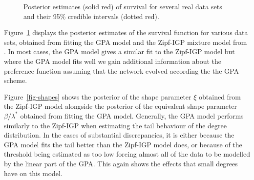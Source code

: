 \documentclass[
  sn-basic,
]{sn-jnl}
\theoremstyle{plain}
\theoremstyle{plain}
\theoremstyle{remark}
\begin{document}
\begin{figure}


\caption{\label{fig-real1}Posterior estimates (solid red) of survival
for several real data sets and their 95\% credible intervals (dotted
red).}

\end{figure}%

Figure~\ref{fig-real1} displays the posterior estimates of the survival
function for various data sets, obtained from fitting the GPA model and
the Zipf-IGP mixture model from \citet{Lee24}. In most cases, the GPA
model gives a similar fit to the Zipf-IGP model but where the GPA model
fits well we gain additional information about the preference function
assuming that the network evolved according the the GPA scheme.

Figure~\ref{fig-shapes} shows the posterior of the shape parameter
\(\xi\) obtained from the Zipf-IGP model alongside the posterior of the
equivalent shape parameter \(\beta/\lambda^*\) obtained from fitting the
GPA model. Generally, the GPA model performs similarly to the Zipf-IGP
when estimating the tail behaviour of the degree distribution. In the
cases of substantial discrepancies, it is either because the GPA model
fits the tail better than the Zipf-IGP model does, or because of the
threshold being estimated as too low forcing almost all of the data to
be modelled by the linear part of the GPA. This again shows the effects
that small degrees have on this model.
\end{document}
